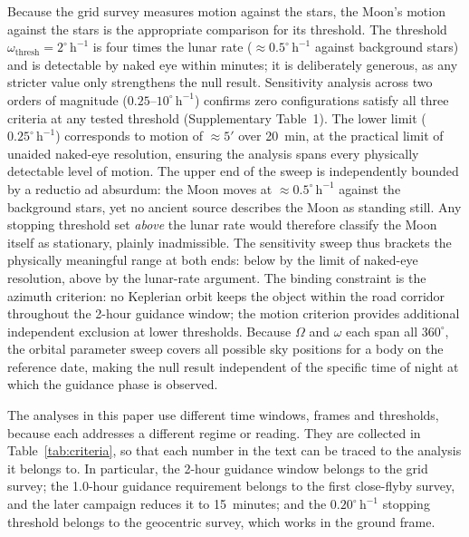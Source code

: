 \documentclass[sn-nature]{sn-jnl}
\begin{document}
Because the grid survey measures motion against the stars, the Moon's
motion against the stars is the appropriate comparison for its threshold.
The threshold $\omega_\text{thresh}=2^\circ\,\mathrm{h}^{-1}$ is four
times the lunar rate (${\approx}0.5^\circ\,\mathrm{h}^{-1}$ against background
stars) and is detectable by naked eye within minutes; it is deliberately
generous, as any stricter value only strengthens the null result.
Sensitivity analysis across two orders of magnitude ($0.25$--$10^\circ\,\mathrm{h}^{-1}$)
confirms zero configurations satisfy all three criteria at any tested threshold
(Supplementary Table~1). The lower limit ($0.25^\circ\,\mathrm{h}^{-1}$)
corresponds to motion of ${\approx}5'$ over 20~min, at the practical limit of
unaided naked-eye resolution, ensuring the analysis spans every physically
detectable level of motion.
The upper end of the sweep is independently bounded by a reductio ad absurdum:
the Moon moves at ${\approx}0.5^\circ\,\mathrm{h}^{-1}$ against the background
stars, yet no ancient source describes the Moon as standing still.
Any stopping threshold set \emph{above} the lunar rate would therefore classify
the Moon itself as stationary, plainly inadmissible.
The sensitivity sweep thus brackets the physically meaningful range at both ends:
below by the limit of naked-eye resolution, above by the lunar-rate argument.
The binding constraint is the azimuth
criterion: no Keplerian orbit keeps the object within the road corridor
throughout the 2-hour guidance window; the motion criterion provides
additional independent exclusion at lower thresholds.
Because $\Omega$ and $\omega$ each span all $360^\circ$, the orbital parameter
sweep covers all possible sky positions for a body on the reference date,
making the null result independent of the specific time of night at which the
guidance phase is observed.

The analyses in this paper use different time windows, frames and thresholds,
because each addresses a different regime or reading. They are collected in
Table~\ref{tab:criteria}, so that each number in the text can be traced to the
analysis it belongs to. In particular, the 2-hour guidance window belongs to
the grid survey; the 1.0-hour guidance requirement belongs to the first
close-flyby survey, and the later campaign reduces it to 15~minutes; and the
$0.20^\circ\,\mathrm{h}^{-1}$ stopping threshold belongs to the geocentric
survey, which works in the ground frame.
\end{document}
